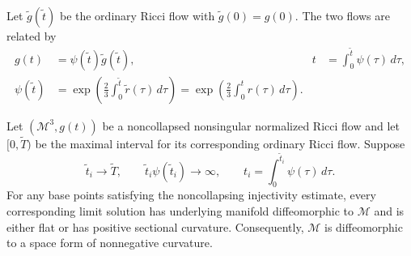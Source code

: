 Let $\widetilde g(\widetilde t)$ be the ordinary Ricci flow with
$\widetilde g(0)=g(0)$.  The two flows are related by
\begin{align*}
 g(t)&=\psi(\widetilde t)\widetilde g(\widetilde t),
 &t&=\int_0^{\widetilde t}\psi(\tau)\,d\tau, \tag{32.9}\\
 \psi(\widetilde t)
 &=\exp\left(\frac23\int_0^{\widetilde t}\widetilde r(\tau)\,d\tau\right)
 =\exp\left(\frac23\int_0^t r(\tau)\,d\tau\right). \tag{32.10}
\end{align*}

\begin{lemma}
\label{lem:chow-iv-limit-nonnegative-curvature-criterion}
Let $(\mathcal M^3,g(t))$ be a noncollapsed nonsingular normalized Ricci
flow and let $[0,\widetilde T)$ be the maximal interval for its corresponding
ordinary Ricci flow.  Suppose
\[
 \widetilde t_i\to\widetilde T,
 \qquad
 \widetilde t_i\psi(\widetilde t_i)\to\infty,
 \qquad
 t_i=\int_0^{\widetilde t_i}\psi(\tau)\,d\tau.
 \tag{32.11}
\]
For any base points satisfying the noncollapsing injectivity estimate, every
corresponding limit solution has underlying manifold diffeomorphic to
$\mathcal M$ and is either flat or has positive sectional curvature.
Consequently, $\mathcal M$ is diffeomorphic to a space form of nonnegative
curvature.
\end{lemma}
